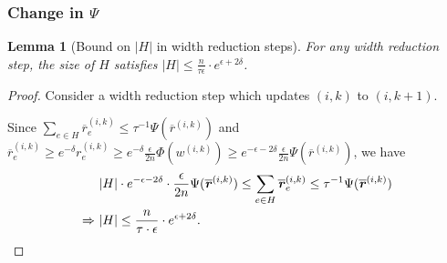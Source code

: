 \documentclass[11pt]{article}
\newtheorem{lemma}[theorem]{Lemma}
\def\implies{\Rightarrow}
\newcommand\rr{\boldsymbol{\mathit{r}}}
\newcommand\ww{\boldsymbol{\mathit{w}}}
\newcommand\rrbar{\overline{\boldsymbol{\mathit{r}}}}
\newcommand{\ov}{\overline}
\begin{document}
\subsubsection{Change in \texorpdfstring{$\Psi$}{Psi}}
\begin{lemma}[Bound on $|H|$ in width reduction steps]\label{lem:size_H}
For any width reduction step, the size of $H$ satisfies $|H| \leq \frac{n}{\tau \epsilon} \cdot e^{\epsilon+2\delta}$.
\end{lemma}
\begin{proof}
Consider a width reduction step which updates $(i,k)$ to $(i,k+1)$. 

Since $\sum_{e\in H}\rrbar_e^{(i,k)}\leq \tau^{-1}\Psi(\rrbar^{(i,k)})$ and $\ov{\rr}_e^{(i,k)} \geq e^{-\delta} \rr_e^{(i,k)} \geq e^{-\delta} \frac{\epsilon}{2n} \Phi(\ww^{(i,k)}) \geq e^{-\epsilon-2\delta} \frac{\epsilon}{2n} \Psi(\ov{\rr}^{(i,k)})$, we have
\begin{align*}
&~ |H| \cdot e^{-\epsilon-2\delta} \cdot \frac{\epsilon}{2n} \Psi(\ov{\rr}^{(i,k)}) \leq \sum_{e\in H}\rrbar_e^{(i,k)} \leq \tau^{-1}\Psi(\rrbar^{(i,k)}) \\
\implies &~ |H| \leq \frac{n}{\tau \cdot \epsilon} \cdot e^{\epsilon+2\delta}. \qedhere
\end{align*} 
\end{proof} 
\end{document}
